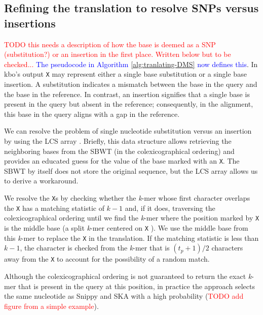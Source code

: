 \documentclass[unnumsec,webpdf,contemporary,large]{oup-authoring-template}%
\theoremstyle{thmstyleone}%
\theoremstyle{thmstyletwo}%
\theoremstyle{thmstylethree}%
\begin{document}

\subsection{Refining the translation to resolve SNPs versus insertions}
\textcolor{red}{TODO this needs a description of how the base is deemed as a SNP (substitution?) or an insertion in the first place. Written below but to be checked...} \textcolor{blue}{The pseudocode in Algorithm \ref{alg:tranlating-DMS} now defines this}.
In kbo's output {\tt X} may represent either a single base substitution or a single base insertion.
A substitution indicates a mismatch between the base in the query and the base in the reference. In contrast, an insertion signifies that a single base is present in the query but absent in the reference; consequently, in the alignment, this base in the query aligns with a gap in the reference.
  
We can resolve the problem of single nucleotide substitution versus an insertion by using the LCS array \cite{alanko2023longest}. Briefly, this data structure allows retrieving the neighboring bases from the SBWT (in the colexicographical ordering) and provides an educated guess for the value of the base marked with an {\tt X}. The SBWT by itself does not store the original sequence, but the LCS array allows us to derive a workaround.

We resolve the {\tt X}s by checking whether the \emph{k}-mer whose first character overlaps the {\tt X} has a matching statistic of $k - 1$ and, if it does, traversing the colexicographical ordering until we find the \emph{k}-mer where the position marked by {\tt X} is the middle base (a split \emph{k}-mer centered on {\tt X} \cite{derelle2024seamless}). We use the middle base from this \emph{k}-mer to replace the {\tt X} in the translation. If the matching statistic is less than $k - 1$, the character is checked from the \emph{k}-mer that is $(t_p + 1)/2$ characters away from the {\tt X} to account for the possibility of a random match.

Although the colexicographical ordering is not guaranteed to return the exact \emph{k}-mer that is present in the query at this position, in practice the approach selects the same nucleotide as Snippy and SKA with a high probability (\textcolor{red}{TODO add figure from a simple example}).
\end{document}
